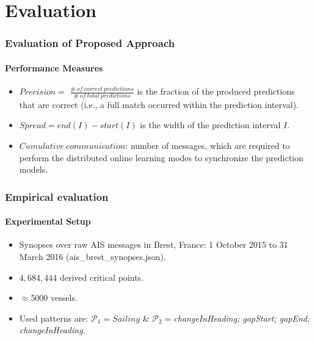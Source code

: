 
\section{Evaluation}
\begin{frame}
	
	\frametitle{ Evaluation of Proposed Approach }
	\framesubtitle{Performance Measures}

		\begin{itemize}
			\item<1->  $\mathit{Precision} =$ $ \mathit{\frac{\#\ of\ correct\ predictions}{\#\ of\ total\ predictions}}$ is the fraction of the produced predictions that are correct (i.e., a full match occurred within the prediction interval).   
			
			\item<2-> $\mathit{Spread} =end(I) -start(I)$ is the width of the prediction interval $I$.  
			
				\item<3->  $\mathit{Cumulative\ communication}$:
		   number of messages, which are required to perform the distributed online learning modes to synchronize the prediction models.
		\end{itemize}

\end{frame}



%	
%	


\begin{frame}
	
	\frametitle{Empirical evaluation }
	\framesubtitle{Experimental Setup}
\begin{itemize}
	\item<1-> Synopses over raw AIS messages in Brest, France: 1 October 2015 to 31 March 2016 (ais\_brest\_synopses.json). 
	
	\item<1->$ 4,684,444$ derived critical points.
	
	\item<1->  $\approx5000$ vessels.
	\item<2> Used patterns are:
	$\mathcal{P}_1=Sailing$  \& \newline
	$\mathcal{P}_2=$\textit{changeInHeading; gapStart; gapEnd; changeInHeading}.
\end{itemize}
	
\end{frame}


